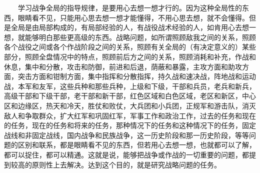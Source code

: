 \documentclass[cn,11pt,chinese]{elegantbook}
\begin{document}
　　学习战争全局的指导规律，是要用心去想一想才行的。因为这种全局性的东西，眼睛看不见，只能用心思去想一想才能懂得，不用心思去想，就不会懂得。但是全局是由局部构成的，有局部经验的人，有战役战术经验的人，如肯用心去想一想，就能够明白那些更高级的东西。战略问题，如所谓照顾敌我之间的关系，照顾各个战役之间或各个作战阶段之间的关系，照顾有关全局的（有决定意义的）某些部分，照顾全盘情况中的特点，照顾前后方之间的关系，照顾消耗和补充，作战和休息，集中和分散，攻击和防御，前进和后退，荫蔽和暴露，主攻方面和助攻方面，突击方面和钳制方面，集中指挥和分散指挥，持久战和速决战，阵地战和运动战，本军和友军，这些兵种和那些兵种，上级和下级，干部和兵员，老兵和新兵，高级干部和下级干部，老干部和新干部，红色区域和白色区域，老区和新区，中心区和边缘区，热天和冷天，胜仗和败仗，大兵团和小兵团，正规军和游击队，消灭敌人和争取群众，扩大红军和巩固红军，军事工作和政治工作，过去的任务和现在的任务，现在的任务和将来的任务，那种情况下的任务和这种情况下的任务，固定战线和非固定战线，国内战争和民族战争，这一历史阶段和那一历史阶段，等等问题的区别和联系，都是眼睛看不见的东西，但若用心去想一想，也就都可以了解，都可以捉住，都可以精通。这就是说，能够把战争或作战的一切重要的问题，都提到较高的原则性上去解决。达到这个目的，就是研究战略问题的任务。\\
\end{document}
